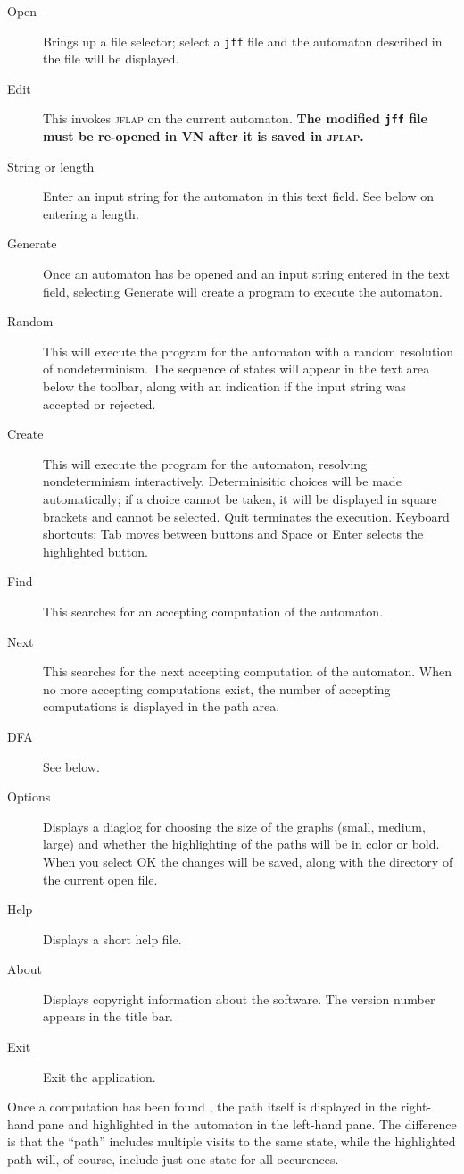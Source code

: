 \documentclass[11pt]{article}
\newcommand{\vn}{\textsc{VN}}
\newcommand{\jf}{\textsc{jflap}}
\newcommand{\p}[1]{\texttt{#1}}
\newcommand{\bu}[1]{\textsf{#1}}
\begin{document}
\begin{description}
\item[\bu{Open}] Brings up a file selector; select a \p{jff} file and the 
automaton described in the file will be displayed.
\item[\bu{Edit}] This invokes \jf{} on the current automaton.
\textbf{The modified \p{jff} file must be re-opened in \vn{} after it is
saved in \jf{}.}
\item[\bu{String or length}] Enter an input string for the automaton in this text field.
See below on entering a length.
\item[\bu{Generate}] Once an automaton has be opened and an input string entered in 
the text field, selecting \bu{Generate} will create a program to execute the 
automaton.
\item[\bu{Random}] This will execute the program for the automaton with a 
random resolution of nondeterminism. The sequence of states will appear in the 
text area below the toolbar, along with an indication if the input string was 
accepted or rejected.
\item[\bu{Create}] This will execute the program for the automaton, resolving 
nondeterminism interactively. Determinisitic choices will be made 
automatically; if a choice cannot be taken, it will be displayed in square 
brackets and cannot be selected. \bu{Quit} terminates the execution. Keyboard 
shortcuts: \bu{Tab} moves between buttons and \bu{Space} or \bu{Enter} selects the 
highlighted button.
\item[\bu{Find}] This searches for an accepting computation of the automaton.
\item[\bu{Next}] This searches for the next accepting computation of the automaton.
When no more accepting computations exist, the number of accepting computations
is displayed in the path area.
\item[\bu{DFA}] See below.
\item[\bu{Options}] Displays a diaglog for choosing the size of the graphs
(small, medium, large) and whether the highlighting of the paths will be in
color or bold. When you select \bu{OK} the changes will be saved, 
along with the directory of the current open file.
\item[\bu{Help}] Displays a short help file.
\item[\bu{About}] Displays copyright information about the software. The 
version number appears in the title bar.
\item[\bu{Exit}] Exit the application.
\end{description}
Once a computation has been found , the path itself is displayed
in the right-hand pane and highlighted
in the automaton in the left-hand pane. The difference is that the 
``path'' includes multiple visits to the same state, while the highlighted path 
will, of course, include just one state for all occurences.
\end{document}
